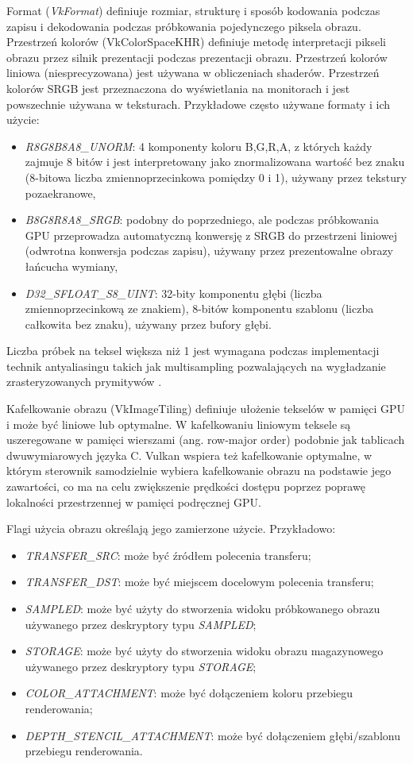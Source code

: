 Format (\textit{VkFormat}) definiuje rozmiar, strukturę i sposób kodowania podczas zapisu i dekodowania podczas próbkowania pojedynczego piksela obrazu.
Przestrzeń kolorów (VkColorSpaceKHR) definiuje metodę interpretacji pikseli obrazu przez silnik prezentacji podczas prezentacji obrazu.
Przestrzeń kolorów liniowa (niesprecyzowana) jest używana w obliczeniach shaderów.
Przestrzeń kolorów SRGB jest przeznaczona do wyświetlania na monitorach i jest powszechnie używana w teksturach.
Przykładowe często używane formaty i ich użycie:
\begin{itemize}
	\item \textit{R8G8B8A8\_UNORM}: 4 komponenty koloru B,G,R,A, z których każdy zajmuje 8 bitów i jest interpretowany jako znormalizowana wartość bez znaku (8-bitowa liczba zmiennoprzecinkowa pomiędzy 0 i 1), używany przez tekstury pozaekranowe,
	\item \textit{B8G8R8A8\_SRGB}: podobny do poprzedniego, ale podczas próbkowania GPU przeprowadza automatyczną konwersję z SRGB do przestrzeni liniowej (odwrotna konwersja podczas zapisu), używany przez prezentowalne obrazy łańcucha wymiany,
	\item \textit{D32\_SFLOAT\_S8\_UINT}: 32-bity komponentu głębi (liczba zmiennoprzecinkową ze znakiem), 8-bitów komponentu szablonu (liczba całkowita bez znaku), używany przez bufory głębi.
\end{itemize}

Liczba próbek na teksel większa niż 1 jest wymagana podczas implementacji technik antyaliasingu takich jak multisampling pozwalających na wygładzanie zrasteryzowanych prymitywów \cite{HughesDamEtAl13}.

Kafelkowanie obrazu (VkImageTiling) definiuje ułożenie tekselów w pamięci GPU i może być liniowe lub optymalne.
W kafelkowaniu liniowym teksele są uszeregowane w pamięci wierszami (ang. row-major order) podobnie jak tablicach dwuwymiarowych języka C.
Vulkan wspiera też kafelkowanie optymalne, w którym sterownik samodzielnie wybiera kafelkowanie obrazu na podstawie jego zawartości, co ma na celu zwiększenie prędkości dostępu poprzez poprawę lokalności przestrzennej w pamięci podręcznej GPU.

Flagi użycia obrazu określają jego zamierzone użycie.
Przykładowo:
\begin{itemize}
	\item \textit{TRANSFER\_SRC}: może być źródłem polecenia transferu;
	\item \textit{TRANSFER\_DST}: może być miejscem docelowym polecenia transferu;
	\item \textit{SAMPLED}: może być użyty do stworzenia widoku próbkowanego obrazu używanego przez deskryptory typu \textit{SAMPLED};
	\item \textit{STORAGE}: może być użyty do stworzenia widoku obrazu magazynowego używanego przez deskryptory typu \textit{STORAGE};
	\item \textit{COLOR\_ATTACHMENT}: może być dołączeniem koloru przebiegu renderowania;
	\item \textit{DEPTH\_STENCIL\_ATTACHMENT}: może być dołączeniem głębi/szablonu przebiegu renderowania.
\end{itemize}

